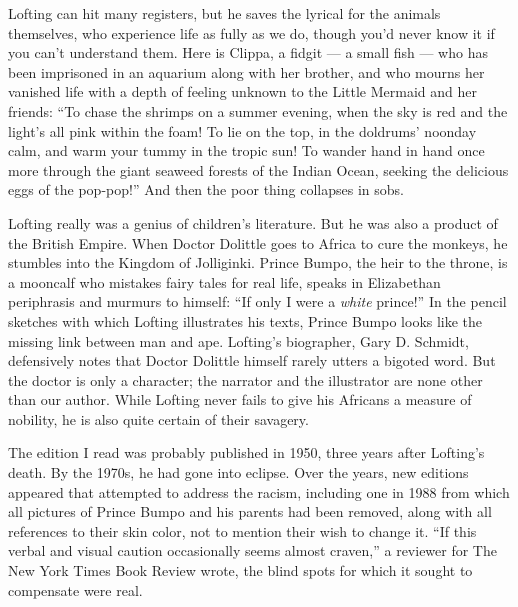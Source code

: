Lofting can hit many registers, but he saves the lyrical for the animals
themselves, who experience life as fully as we do, though you'd never
know it if you can't understand them. Here is Clippa, a fidgit --- a
small fish --- who has been imprisoned in an aquarium along with her
brother, and who mourns her vanished life with a depth of feeling
unknown to the Little Mermaid and her friends: ``To chase the shrimps on
a summer evening, when the sky is red and the light's all pink within
the foam! To lie on the top, in the doldrums' noonday calm, and warm
your tummy in the tropic sun! To wander hand in hand once more through
the giant seaweed forests of the Indian Ocean, seeking the delicious
eggs of the pop-pop!'' And then the poor thing collapses in sobs.

Lofting really was a genius of children's literature. But he was also a
product of the British Empire. When Doctor Dolittle goes to Africa to
cure the monkeys, he stumbles into the Kingdom of Jolliginki. Prince
Bumpo, the heir to the throne, is a mooncalf who mistakes fairy tales
for real life, speaks in Elizabethan periphrasis and murmurs to himself:
``If only I were a \emph{white} prince!'' In the pencil sketches with
which Lofting illustrates his texts, Prince Bumpo looks like the missing
link between man and ape. Lofting's biographer, Gary D. Schmidt,
defensively notes that Doctor Dolittle himself rarely utters a bigoted
word. But the doctor is only a character; the narrator and the
illustrator are none other than our author. While Lofting never fails to
give his Africans a measure of nobility, he is also quite certain of
their savagery.

The edition I read was probably published in 1950, three years after
Lofting's death. By the 1970s, he had gone into eclipse. Over the years,
new editions appeared that attempted to address the racism, including
one in 1988 from which all pictures of Prince Bumpo and his parents had
been removed, along with all references to their skin color, not to
mention their wish to change it. ``If this verbal and visual caution
occasionally seems almost craven,'' a reviewer for The New York Times
Book Review wrote, the blind spots for which it sought to compensate
were real.

